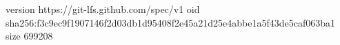 version https://git-lfs.github.com/spec/v1
oid sha256:f3c9ec9f1907146f2d03db1d95408f2e45a21d25e4abbe1a5f43de5caf063ba1
size 699208
